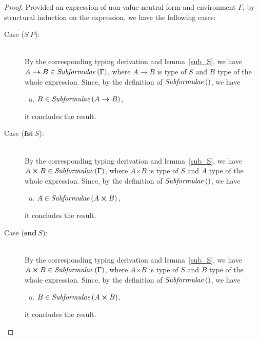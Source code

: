 \documentclass[a4paper]{article}
\newcommand{\typarr}[2]{#1\boldsymbol{\rightarrow}#2}
\newcommand{\typprd}[2]{#1\boldsymbol{\times}#2}
\newcommand{\expapp}[2]{#1\ #2}
\newcommand{\expfst}[1]{\mathbf{fst}\ #1}
\newcommand{\expsnd}[1]{\mathbf{snd}\ #1}
\newcommand{\txt}[1]{\text{\textit{#1}}}
\newcommand{\subformulae}[1]{\txt{Subformulae}\,(#1)}
\begin{document}
\begin{proof}
Provided an expression of non-value neutral form and environment
$\Gamma$, by structural induction on the expression, we have the following cases:
\begin{description}
\item[Case ($\expapp{S}{P}$):]\ \\ 
  By the corresponding typing derivation and lemma~\ref{sub_S}, we
  have $\typarr{A}{B} \in \subformulae{\Gamma}$, where $\typarr{A}{B}$
  is type of $S$ and $B$ type of the whole expression. Since, by the
  definition of $\subformulae{}$, we have
  \begin{enumerate}[(a)] 
  \item  $B \in \subformulae{\typarr{A}{B}}$,
  \end{enumerate}
  it concludes the result.
\item[Case ($\expfst{S}$):]\ \\
  By the corresponding typing derivation and lemma~\ref{sub_S}, we
  have $\typprd{A}{B} \in \subformulae{\Gamma}$, where $\typprd{A}{B}$
  is type of $S$ and $A$ type of the whole expression. Since, by the
  definition of $\subformulae{}$, we have
  \begin{enumerate}[(a)] 
  \item $A \in \subformulae{\typprd{A}{B}}$,
  \end{enumerate}
  it concludes the result.
\item[Case ($\expsnd{S}$):]\ \\
  By the corresponding typing derivation and lemma~\ref{sub_S}, we
  have $\typprd{A}{B} \in \subformulae{\Gamma}$, where $\typprd{A}{B}$
  is type of $S$ and $B$ type of the whole expression. Since, by the
  definition of $\subformulae{}$, we have
  \begin{enumerate}[(a)] 
  \item $B \in \subformulae{\typprd{A}{B}}$,
  \end{enumerate}
  it concludes the result.
\end{description}
\end{proof}
\end{document}
